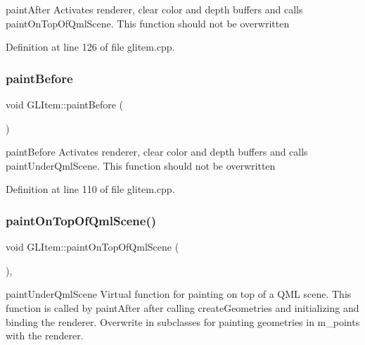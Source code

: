 paint\+After Activates renderer, clear color and depth buffers and calls paint\+On\+Top\+Of\+Qml\+Scene. This function should not be overwritten 



Definition at line 126 of file glitem.\+cpp.

\mbox{\label{class_g_l_item_a1b613d9ef12ba94771b505798170c6e9}} 
\subsubsection{\texorpdfstring{paintBefore}{paintBefore}}
{\footnotesize\ttfamily void G\+L\+Item\+::paint\+Before (\begin{DoxyParamCaption}{ }\end{DoxyParamCaption})\hspace{0.3cm}{\ttfamily [slot]}}



paint\+Before Activates renderer, clear color and depth buffers and calls paint\+Under\+Qml\+Scene. This function should not be overwritten 



Definition at line 110 of file glitem.\+cpp.

\mbox{\label{class_g_l_item_a595830cf6ae5434a253c68366275b65d}} 
\subsubsection{\texorpdfstring{paintOnTopOfQmlScene()}{paintOnTopOfQmlScene()}}
{\footnotesize\ttfamily void G\+L\+Item\+::paint\+On\+Top\+Of\+Qml\+Scene (\begin{DoxyParamCaption}{ }\end{DoxyParamCaption})\hspace{0.3cm}{\ttfamily [protected]}, {\ttfamily [virtual]}}



paint\+Under\+Qml\+Scene Virtual function for painting on top of a Q\+ML scene. This function is called by paint\+After after calling create\+Geometries and initializing and binding the renderer. Overwrite in subclasses for painting geometries in m\+\_\+points with the renderer. 




